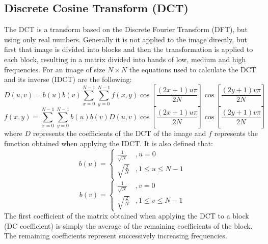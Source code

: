\documentclass[runningheads]{llncs}
\begin{document}
\subsection{Discrete Cosine Transform (DCT)}
The DCT \cite{ahmed1974discrete} is a transform based on the Discrete Fourier Transform (DFT), but using only real numbers. Generally it is not applied to the image directly, but first that image is divided into blocks and then the transformation is applied to each block, resulting in a matrix divided into bands of low, medium and high frequencies. For an image of size $N\times N$ the equations used to calculate the DCT and its inverse (IDCT) are the following:
\begin{equation}
D(u,v)=b(u)b(v)\sum_{x=0}^{N-1}\sum_{y=0}^{N-1}f(x,y)\cos\left[\frac{\left(2x+1\right)u\pi}{2N}\right]\cos\left[\frac{\left(2y+1\right)v\pi}{2N}\right]
\end{equation}
\begin{equation}
f(x,y)=\sum_{x=0}^{N-1}\sum_{y=0}^{N-1}b(u)b(v)D(u,v)\cos\left[\frac{\left(2x+1\right)u\pi}{2N}\right]\cos\left[\frac{\left(2y+1\right)v\pi}{2N}\right]
\end{equation}
where $D$ represents the coefficients of the DCT of the image and $f$ represents the function obtained when applying the IDCT. It is also defined that:
\begin{equation}
b(u)=\begin{cases}
\frac{1}{\sqrt{N}} & ,u=0\\
\sqrt{\frac{2}{N}} & ,1\leq u\leq N-1
\end{cases}
\end{equation}
\begin{equation}
b(v)=\begin{cases}
\frac{1}{\sqrt{N}} & ,v=0\\
\sqrt{\frac{2}{N}} & ,1\leq v\leq N-1
\end{cases}
\end{equation}
The first coefficient of the matrix obtained when applying the DCT to a block (DC coefficient) is simply the average of the remaining coefficients of the block. The remaining coefficients represent successively increasing frequencies.
\end{document}
